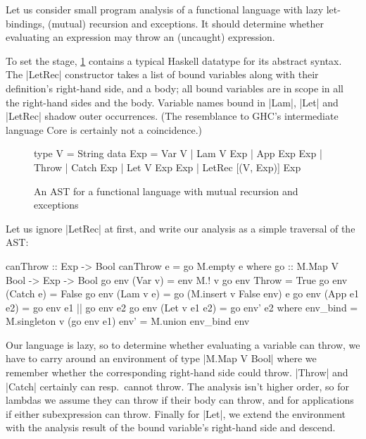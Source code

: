 \documentclass[manuscript,anonymous,screen,acmsmall]{acmart}
\begin{document}
Let us consider small program analysis of a functional language with lazy let-bindings, (mutual) recursion and exceptions. It should determine whether evaluating an expression may throw an (uncaught) expression.

To set the stage, \cref{fig:analast} contains a typical Haskell datatype for its abstract syntax. The |LetRec| constructor takes a list of bound variables along with their definition's  right-hand side, and a body; all bound variables are in scope in all the right-hand sides and the body.
Variable names bound in |Lam|, |Let| and |LetRec| shadow outer occurrences. (The resemblance to GHC's intermediate language Core \citep{secrets} is certainly not a coincidence.)

\begin{figure}
\setlength{\abovedisplayskip}{0pt}%
\setlength{\belowdisplayskip}{0pt}%
\begin{code}
type V    =  String
data Exp  =  Var V | Lam V Exp | App Exp Exp | Throw | Catch Exp
          |  Let V Exp Exp | LetRec [(V, Exp)] Exp
\end{code}
\caption{An AST for a functional language with mutual recursion and exceptions}
\label{fig:analast}
\end{figure}

Let us ignore |LetRec| at first, and write our analysis as a simple traversal of the AST:
\savecolumns
\begin{code}
canThrow :: Exp -> Bool
canThrow e = go M.empty e
  where
    go :: M.Map V Bool -> Exp -> Bool
    go env (Var v)        = env M.! v
    go env Throw          = True
    go env (Catch e)      = False
    go env (Lam v e)      = go (M.insert v False env) e
    go env (App e1 e2)    = go env e1 || go env e2
    go env (Let v e1 e2)  = go env' e2
      where
        env_bind  = M.singleton v (go env e1)
        env'      = M.union env_bind env
\end{code}

Our language is lazy, so to determine whether evaluating a variable can throw,
we have to carry around an
environment of type |M.Map V Bool| where we remember whether the corresponding right-hand side could throw. |Throw| and |Catch| certainly can resp.\ cannot throw. The analysis isn't higher order, so for lambdas we assume they can throw if their body can throw, and for applications if either subexpression can throw. Finally for |Let|, we extend the environment with the analysis result of the bound variable's right-hand side and descend.
\end{document}
